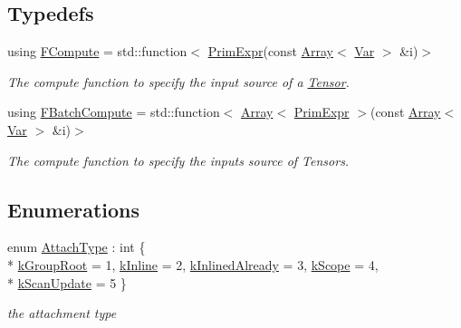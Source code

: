 \subsection*{Typedefs}
\begin{DoxyCompactItemize}
\item 
using \hyperlink{namespacetvm_1_1te_a234ec7f58c22878752d476bd7e99bcea}{F\+Compute} = std\+::function$<$ \hyperlink{classtvm_1_1PrimExpr}{Prim\+Expr}(const \hyperlink{classtvm_1_1Array}{Array}$<$ \hyperlink{classtvm_1_1tir_1_1Var}{Var} $>$ \&i)$>$
\begin{DoxyCompactList}\small\item\em The compute function to specify the input source of a \hyperlink{classtvm_1_1te_1_1Tensor}{Tensor}. \end{DoxyCompactList}\item 
using \hyperlink{namespacetvm_1_1te_aabb227a4a0747faf17a2a8028f5430d5}{F\+Batch\+Compute} = std\+::function$<$ \hyperlink{classtvm_1_1Array}{Array}$<$ \hyperlink{classtvm_1_1PrimExpr}{Prim\+Expr} $>$(const \hyperlink{classtvm_1_1Array}{Array}$<$ \hyperlink{classtvm_1_1tir_1_1Var}{Var} $>$ \&i)$>$
\begin{DoxyCompactList}\small\item\em The compute function to specify the inputs source of Tensors. \end{DoxyCompactList}\end{DoxyCompactItemize}
\subsection*{Enumerations}
\begin{DoxyCompactItemize}
\item 
enum \hyperlink{namespacetvm_1_1te_a7693a274748dadfa2eaa35f5ce9008a5}{Attach\+Type} \+: int \{ \\*
\hyperlink{namespacetvm_1_1te_a7693a274748dadfa2eaa35f5ce9008a5aac738a0b856206b6347a1f4899f31bfa}{k\+Group\+Root} = 1, 
\hyperlink{namespacetvm_1_1te_a7693a274748dadfa2eaa35f5ce9008a5a6472eda35fc70bd00e3ce3b3ce3047fc}{k\+Inline} = 2, 
\hyperlink{namespacetvm_1_1te_a7693a274748dadfa2eaa35f5ce9008a5af4fc945dfabb70f21d7341f8ee0b3cf3}{k\+Inlined\+Already} = 3, 
\hyperlink{namespacetvm_1_1te_a7693a274748dadfa2eaa35f5ce9008a5a672a7857e6a2ba34f56bc81e66f4133e}{k\+Scope} = 4, 
\\*
\hyperlink{namespacetvm_1_1te_a7693a274748dadfa2eaa35f5ce9008a5a502d1f34c7923709e22688c3a1514e80}{k\+Scan\+Update} = 5
 \}\begin{DoxyCompactList}\small\item\em the attachment type \end{DoxyCompactList}
\end{DoxyCompactItemize}
